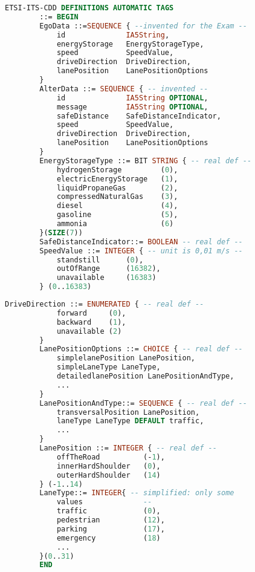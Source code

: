 \documentclass[a4paper,10pt]{article}
\begin{document}
\begin{multicols}{2}
    \begin{lstlisting}[language=ASN.1]
        ETSI-ITS-CDD DEFINITIONS AUTOMATIC TAGS
        ::= BEGIN
        EgoData ::=SEQUENCE { --invented for the Exam --
            id              IA5String,
            energyStorage   EnergyStorageType,
            speed           SpeedValue,
            driveDirection  DriveDirection,
            lanePosition    LanePositionOptions
        }
        AlterData ::= SEQUENCE { -- invented --
            id              IA5String OPTIONAL,
            message         IA5String OPTIONAL,
            safeDistance    SafeDistanceIndicator,
            speed           SpeedValue,
            driveDirection  DriveDirection,
            lanePosition    LanePositionOptions
        }
        EnergyStorageType ::= BIT STRING { -- real def --
            hydrogenStorage         (0),
            electricEnergyStorage   (1),
            liquidPropaneGas        (2),
            compressedNaturalGas    (3),
            diesel                  (4),
            gasoline                (5),
            ammonia                 (6)
        }(SIZE(7))
        SafeDistanceIndicator::= BOOLEAN -- real def --
        SpeedValue ::= INTEGER { -- unit is 0,01 m/s --
            standstill      (0),
            outOfRange      (16382),
            unavailable     (16383)
        } (0..16383)
    \end{lstlisting}

    \vfill %

    \begin{lstlisting}[language=ASN.1]
        DriveDirection ::= ENUMERATED { -- real def --
            forward     (0),
            backward    (1),
            unavailable (2)
        }
        LanePositionOptions ::= CHOICE { -- real def --
            simplelanePosition LanePosition,
            simpleLaneType LaneType,
            detailedlanePosition LanePositionAndType,
            ...
        }
        LanePositionAndType::= SEQUENCE { -- real def --
            transversalPosition LanePosition,
            laneType LaneType DEFAULT traffic,
            ...
        }
        LanePosition ::= INTEGER { -- real def --
            offTheRoad          (-1),
            innerHardShoulder   (0),
            outerHardShoulder   (14)
        } (-1..14)
        LaneType::= INTEGER{ -- simplified: only some
            values              --
            traffic             (0),
            pedestrian          (12),
            parking             (17),
            emergency           (18)
            ...
        }(0..31)
        END
    \end{lstlisting}
\end{multicols}
\end{document}
